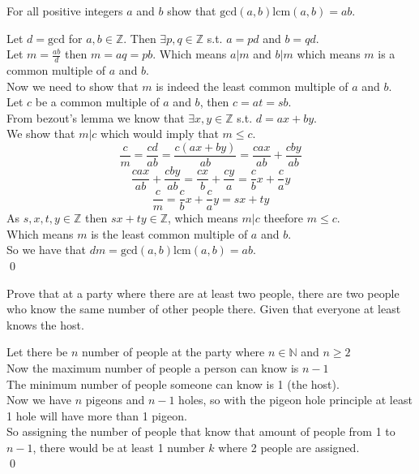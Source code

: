 \documentclass[12pt]{exam}
\begin{document}
\begin{questions}
    \question For all positive integers $a$ and $b$ show that $\text{gcd}(a,b) \text{lcm}(a,b)=ab$.
    \begin{solution}
        Let $d = \text{gcd}$ for $a,b \in \mathbb{Z}$. Then $\exists p,q \in \mathbb{Z}$ s.t. $a = pd$ and $b = qd$.
        \\Let $m = \frac{ab}{d}$ then $m = aq = pb$. Which means $a|m$ and $b|m$ which means $m$ is a common multiple of $a$ and $b$.
        \\Now we need to show that $m$ is indeed the least common multiple of $a$ and $b$.
        \\Let $c$ be a common multiple of $a$ and $b$, then $c = at = sb$.
        \\From bezout's lemma we know that $\exists x,y \in \mathbb{Z}$ s.t. $d = ax + by$.
        \\We show that $m|c$ which would imply that $m \leq c$.
        $$\frac{c}{m} =  \frac{cd}{ab} = \frac{c(ax + by)}{ab} = \frac{cax}{ab} + \frac{cby}{ab}$$
        $$\frac{cax}{ab} + \frac{cby}{ab} = \frac{cx}{b} + \frac{cy}{a} = \frac{c}{b}x + \frac{c}{a}y$$
        $$\frac{c}{m} = \frac{c}{b}x + \frac{c}{a}y = sx + ty$$
        As $s,x,t,y \in \mathbb{Z}$ then $sx + ty \in \mathbb{Z}$, which means $m|c$ theefore $m \leq c$.
        \\Which means $m$ is the least common multiple of $a$ and $b$.
        \\So we have that $dm = \text{gcd}(a,b) \text{lcm}(a,b) = ab$.
        \\\qed
    \end{solution}

    \question Prove that at a party where there are at least two people, there are two people who know the same number of other people there. Given that everyone at least knows the host.
    \begin{solution}
        Let there be $n$ number of people at the party where $n \in \mathbb{N}$ and $n\geq2$ 
        \\Now the maximum number of people a person can know is $n-1$
        \\The minimum number of people someone can know is 1 (the host).
        \\Now we have $n$ pigeons and $n-1$ holes, so with the pigeon hole principle at least 1 hole will have more than 1 pigeon. 
        \\So assigning the number of people that know that amount of people from 1 to $n-1$, there would be at least 1 number $k$ where 2 people are assigned.
        \\\qed
    \end{solution}
\end{questions}



\renewcommand\thefootnote{}


\renewcommand\thefootnote{\fnsymbol{footnote}}
\setcounter{footnote}{1}

\nocite*{}

 


\end{document}
